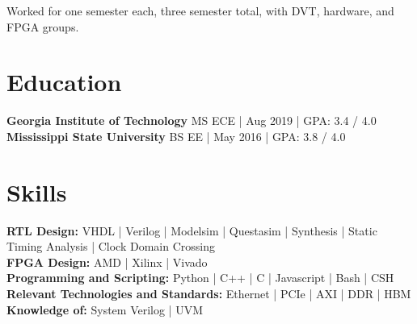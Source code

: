\documentclass[10pt]{deedy-resume-reversed}
\begin{document}
\begin{minipage}[t]{1.0\textwidth}
\begin{tightemize}
\item Worked for one semester each, three semester total, with DVT, hardware, and FPGA groups.
\end{tightemize}
\sectionsep



\section{Education}
\textbf{Georgia Institute of Technology} MS ECE | Aug 2019 | GPA: 3.4 / 4.0 \\ 
\textbf{Mississippi State University} BS EE | May 2016 | GPA: 3.8 / 4.0 \\
\sectionsep




\section{Skills}
\textbf{RTL Design:} VHDL | Verilog | Modelsim | Questasim | Synthesis | Static Timing Analysis |
Clock Domain Crossing \\ 
\textbf{FPGA Design:} AMD | Xilinx | Vivado \\
\textbf{Programming and Scripting:} Python | C++ | C | Javascript | Bash | CSH \\
\textbf{Relevant Technologies and Standards:} Ethernet | PCIe | AXI | DDR | HBM \\
\textbf{Knowledge of:} System Verilog | UVM \\
\sectionsep


\end{minipage}
\end{document}
